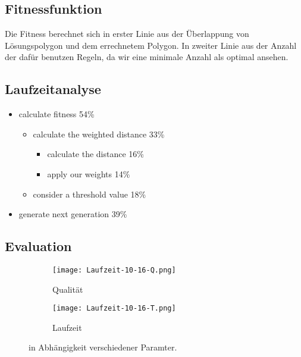 \subsection{Fitnessfunktion}
Die Fitness berechnet sich in erster Linie aus der Überlappung von Lösungspolygon
und dem errechnetem Polygon. In zweiter Linie aus der Anzahl der dafür benutzen Regeln,
da wir eine minimale Anzahl als optimal ansehen.

\subsection[Laufzeitanalyse]{Laufzeitanalyse\protect\footnotemark}
\begin{itemize}
  \item calculate fitness 54\%
  \begin{itemize}
    \item calculate the weighted distance 33\%
    \begin{itemize}
      \item calculate the distance 16\%
      \item apply our weights 14\%
    \end{itemize}
    \item consider a threshold value 18\%
  \end{itemize}
  \item generate next generation 39\%
\end{itemize}

\subsection[Evaluation]{Evaluation\protect\footnotemark}
\label{sec:Evaluation_genAlg}

\begin{figure}
  \begin{subfigure}{\textwidth}
  \texttt{[image: Laufzeit-10-16-Q.png]}
  \caption{Qualität}
  \end{subfigure}

  \begin{subfigure}{\textwidth}
  \texttt{[image: Laufzeit-10-16-T.png]}
  \caption{Laufzeit}
  \end{subfigure}
\caption{in Abhängigkeit verschiedener Paramter.}
\label{fig:GenAlgAll}
\end{figure}

